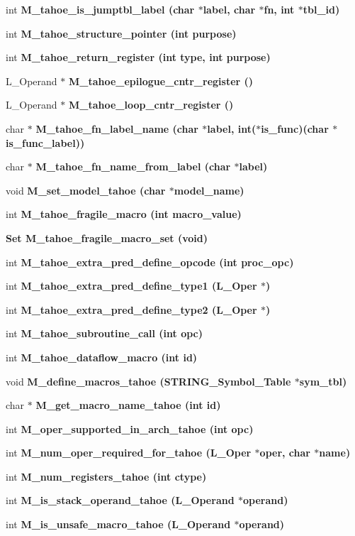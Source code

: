 \begin{CompactItemize}
\item 
int \bf{M\_\-tahoe\_\-is\_\-jumptbl\_\-label} (char $\ast$label, char $\ast$fn, int $\ast$tbl\_\-id)
\item 
int \bf{M\_\-tahoe\_\-structure\_\-pointer} (int purpose)
\item 
int \bf{M\_\-tahoe\_\-return\_\-register} (int type, int purpose)
\item 
L\_\-Operand $\ast$ \bf{M\_\-tahoe\_\-epilogue\_\-cntr\_\-register} ()
\item 
L\_\-Operand $\ast$ \bf{M\_\-tahoe\_\-loop\_\-cntr\_\-register} ()
\item 
char $\ast$ \bf{M\_\-tahoe\_\-fn\_\-label\_\-name} (char $\ast$label, int($\ast$is\_\-func)(char $\ast$is\_\-func\_\-label))
\item 
char $\ast$ \bf{M\_\-tahoe\_\-fn\_\-name\_\-from\_\-label} (char $\ast$label)
\item 
void \bf{M\_\-set\_\-model\_\-tahoe} (char $\ast$model\_\-name)
\item 
int \bf{M\_\-tahoe\_\-fragile\_\-macro} (int macro\_\-value)
\item 
\bf{Set} \bf{M\_\-tahoe\_\-fragile\_\-macro\_\-set} (void)
\item 
int \bf{M\_\-tahoe\_\-extra\_\-pred\_\-define\_\-opcode} (int proc\_\-opc)
\item 
int \bf{M\_\-tahoe\_\-extra\_\-pred\_\-define\_\-type1} (L\_\-Oper $\ast$)
\item 
int \bf{M\_\-tahoe\_\-extra\_\-pred\_\-define\_\-type2} (L\_\-Oper $\ast$)
\item 
int \bf{M\_\-tahoe\_\-subroutine\_\-call} (int opc)
\item 
int \bf{M\_\-tahoe\_\-dataflow\_\-macro} (int id)
\item 
void \bf{M\_\-define\_\-macros\_\-tahoe} (\bf{STRING\_\-Symbol\_\-Table} $\ast$sym\_\-tbl)
\item 
char $\ast$ \bf{M\_\-get\_\-macro\_\-name\_\-tahoe} (int id)
\item 
int \bf{M\_\-oper\_\-supported\_\-in\_\-arch\_\-tahoe} (int opc)
\item 
int \bf{M\_\-num\_\-oper\_\-required\_\-for\_\-tahoe} (L\_\-Oper $\ast$oper, char $\ast$\bf{name})
\item 
int \bf{M\_\-num\_\-registers\_\-tahoe} (int ctype)
\item 
int \bf{M\_\-is\_\-stack\_\-operand\_\-tahoe} (L\_\-Operand $\ast$operand)
\item 
int \bf{M\_\-is\_\-unsafe\_\-macro\_\-tahoe} (L\_\-Operand $\ast$operand)

\end{CompactItemize}
